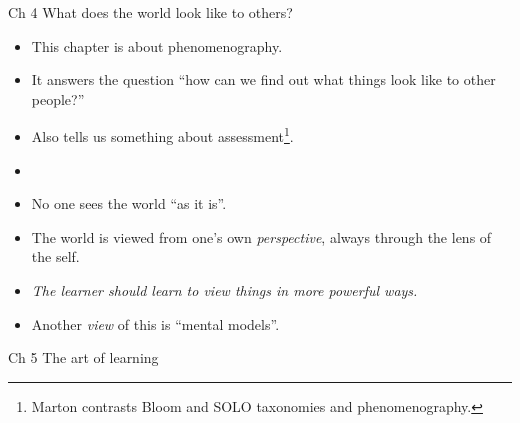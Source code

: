 \begin{frame}
  \begin{block}{Ch 4 What does the world look like to others?}
    \begin{itemize}
      \item This chapter is about phenomenography.
      \item It answers the question \enquote{how can we find out what things 
        look like to other people?}
      \item Also tells us something about assessment\footnote{%
          Marton contrasts Bloom and SOLO taxonomies and phenomenography.
        }.
    \end{itemize}
  \end{block}

  \pause

  \begin{example}
    \begin{itemize}
      \item {}
    \end{itemize}
  \end{example}
\end{frame}

\begin{frame}
  \begin{remark}
    \begin{itemize}
      \item No one sees the world \enquote{as it is}.
      \item The world is viewed from one's own \emph{perspective}, always 
        through the lens of the self.
      \item \emph{The learner should learn to view things in more powerful 
        ways.}
    \end{itemize}
  \end{remark}

  \pause

  \begin{remark}
    \begin{itemize}
      \item Another \emph{view} of this is \enquote{mental models}.
    \end{itemize}
  \end{remark}
\end{frame}

\begin{frame}
  \begin{block}{Ch 5 The art of learning}
  \end{block}
\end{frame}

